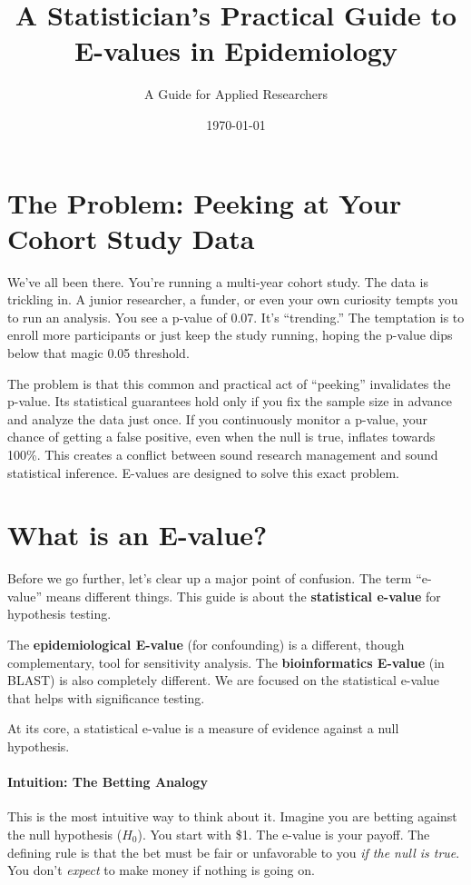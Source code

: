 \documentclass[11pt]{article}
\begin{document}
\title{A Statistician's Practical Guide to E-values in Epidemiology}
\author{A Guide for Applied Researchers}
\date{\today}
\maketitle

\section*{The Problem: Peeking at Your Cohort Study Data}

We've all been there. You're running a multi-year cohort study. The data is trickling in. A junior researcher, a funder, or even your own curiosity tempts you to run an analysis. You see a p-value of 0.07. It's ``trending.'' The temptation is to enroll more participants or just keep the study running, hoping the p-value dips below that magic 0.05 threshold.

The problem is that this common and practical act of ``peeking'' invalidates the p-value. Its statistical guarantees hold only if you fix the sample size in advance and analyze the data just once. If you continuously monitor a p-value, your chance of getting a false positive, even when the null is true, inflates towards 100\%. This creates a conflict between sound research management and sound statistical inference. E-values are designed to solve this exact problem.

\section*{What is an E-value?}

Before we go further, let's clear up a major point of confusion. The term ``e-value'' means different things. This guide is about the \textbf{statistical e-value} for hypothesis testing.

\begin{notebox}
The \textbf{epidemiological E-value} (for confounding) is a different, though complementary, tool for sensitivity analysis. The \textbf{bioinformatics E-value} (in BLAST) is also completely different. We are focused on the statistical e-value that helps with significance testing.
\end{notebox}

At its core, a statistical e-value is a measure of evidence against a null hypothesis.

\paragraph{Intuition: The Betting Analogy}
This is the most intuitive way to think about it. Imagine you are betting against the null hypothesis ($H_0$). You start with \$1. The e-value is your payoff. The defining rule is that the bet must be fair or unfavorable to you \textit{if the null is true}. You don't \textit{expect} to make money if nothing is going on.
\end{document}
